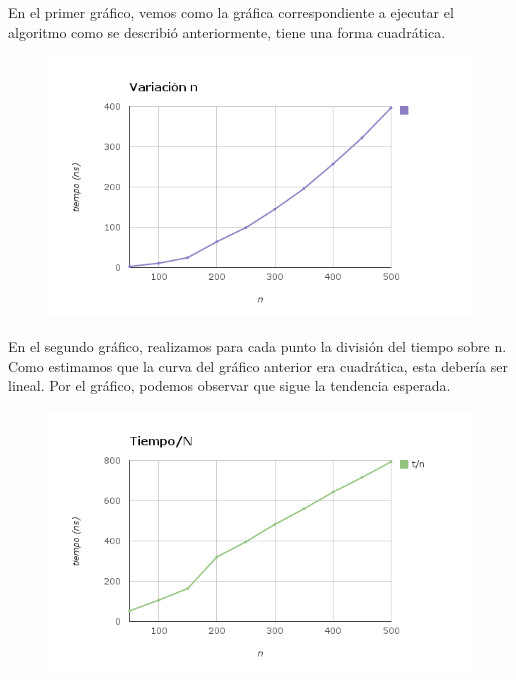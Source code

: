 En el primer gráfico, vemos como la gráfica correspondiente a ejecutar el algoritmo como se describió anteriormente, tiene una forma cuadrática.

\begin{figure}[h]
	\begin{center}
	   \includegraphics[scale=0.50]{ejercicio3/n.png}
	\end{center}
\end{figure}

En el segundo gráfico, realizamos para cada punto la división del tiempo sobre n. Como estimamos que la curva del gráfico anterior era cuadrática, esta debería ser lineal. Por el gráfico, podemos observar que sigue la tendencia esperada.

\begin{figure}[h]
	\begin{center}
	   \includegraphics[scale=0.50]{ejercicio3/n_sobren.png}
	\end{center}
\end{figure}

